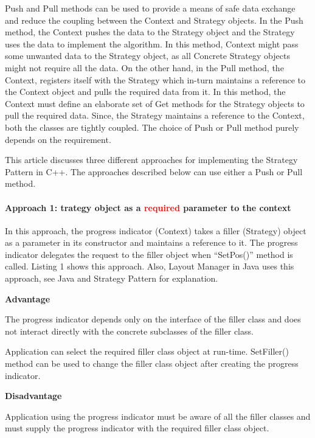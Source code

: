 \documentclass{book}
\begin{document}
Push and Pull methods can be used to provide a means of safe data exchange and reduce the coupling between the Context and Strategy objects.
In the Push method, the Context pushes the data to the Strategy object and the Strategy uses the data to implement the algorithm. 
In this method, Context might pass some unwanted data to the Strategy object, as all Concrete Strategy objects might not require all the data.
On the other hand, in the Pull method, the Context, registers itself with the Strategy which in-turn maintains a reference to the Context object and pulls the required data from it.
In this method, the Context must define an elaborate set of Get methods for the Strategy objects to pull the required data.
Since, the Strategy maintains a reference to the Context, both the classes are tightly coupled. The choice of Push or Pull method purely depends on the requirement.

This article discusses three different approaches for implementing the Strategy Pattern in C++. The approaches described below can use either a Push or Pull method.
\paragraph{Approach 1: trategy object as a \textcolor{red}{required} parameter to the context}

In this approach, the progress indicator (Context) takes a filler (Strategy) object as a parameter in its constructor and maintains a reference to it.
The progress indicator delegates the request to the filler object when ``SetPos()'' method is called. 
Listing 1 shows this approach. Also, Layout Manager in Java uses this approach, see Java and Strategy Pattern for explanation.

\textbf{Advantage}

    The progress indicator depends only on the interface of the filler class and does not interact directly with the concrete subclasses of the filler class.

    Application can select the required filler class object at run-time. SetFiller() method can be used to change the filler class object after creating the progress indicator.

\textbf{Disadvantage}

    Application using the progress indicator must be aware of all the filler classes and must supply the progress indicator with the required filler class object.
\end{document}
